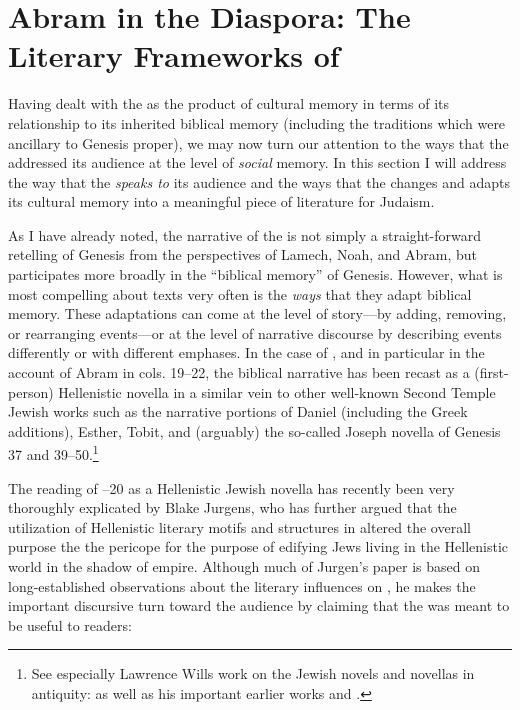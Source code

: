 
\section{Abram in the Diaspora: The Literary Frameworks of \GA}

Having dealt with the \ga as the product of cultural memory in terms of its relationship to its inherited biblical memory (including the traditions which were ancillary to Genesis proper), we may now turn our attention to the ways that the \ga addressed its audience at the level of \emph{social} memory. In this section I will address the way that the \ga \emph{speaks to} its audience and the ways that the \ga changes and adapts its cultural memory into a meaningful piece of literature for \secondtemple Judaism.

As I have already noted, the narrative of the \ga is not simply a straight-forward retelling of Genesis from the perspectives of Lamech, Noah, and Abram, but participates more broadly in the ``biblical memory'' of Genesis. However, what is most compelling about \rwb texts very often is the \emph{ways} that they adapt biblical memory. These adaptations can come at the level of story---by adding, removing, or rearranging events---or at the level of narrative discourse by describing events differently or with different emphases. In the case of \ga, and in particular in the account of Abram in cols. 19--22, the biblical narrative has been recast as a (first-person) Hellenistic novella in a similar vein to other well-known Second Temple Jewish works such as the narrative portions of Daniel (including the Greek additions), Esther, Tobit, and (arguably) the so-called Joseph novella of Genesis 37 and 39--50.\footnote{See especially Lawrence Wills work on the Jewish novels and novellas in antiquity: \cite*{wills2002} as well as his important earlier works \cite*{wills1995} and \cite{wills1990}.}

The reading of --20 as a Hellenistic Jewish novella has recently been very thoroughly explicated by Blake Jurgens, who has further argued that the utilization of Hellenistic literary motifs and structures in \ga altered the overall purpose the the pericope for the purpose of edifying Jews living in the Hellenistic world in the shadow of empire.\autocite{jurgens_jsj2018} Although much of Jurgen's paper is based on long-established observations about the literary influences on \ga, he makes the important discursive turn toward the audience by claiming that the \ga was meant to be useful to readers:

